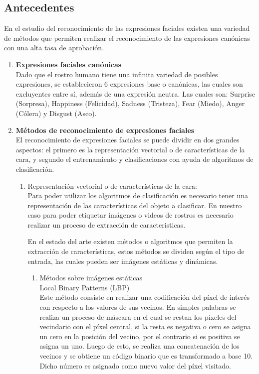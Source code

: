 \documentclass{article}
\begin{document}
    \subsection{Antecedentes}
En el estudio del reconocimiento de las expresiones faciales existen una variedad de métodos que permiten realizar el reconocimiento de las expresiones canónicas con una alta tasa de aprobación.
        \begin{enumerate}
        \item \textbf{Expresiones faciales canónicas}\\
                Dado que el rostro humano tiene una infinita variedad de posibles expresiones, se establecieron 6 expresiones base o canónicas, las cuales son excluyentes entre sí, además de una expresión neutra. Las cuales son:  Surprise (Sorpresa), Happiness (Felicidad), Sadness (Tristeza), Fear (Miedo), Anger (Cólera) y Disgust (Asco).
        \item \textbf{Métodos de reconocimiento de expresiones faciales} \\
        El reconocimiento de expresiones faciales se puede dividir en dos grandes aspectos: el primero es la representación vectorial o de características de la cara, y segundo el entrenamiento y clasificaciones con ayuda de algoritmos de clasificación.
        
        \begin{enumerate}
        \item Representación vectorial o de características de la cara:\\
        Para poder utilizar los algoritmos de clasificación es necesario tener una representación de las características del objeto a clasificar. En nuestro caso para poder etiquetar imágenes o videos de rostros es necesario realizar un proceso de extracción de caracteristicas. 

En el estado del arte existen métodos o algoritmos que permiten la extracción de características, estos métodos se dividen según el tipo de entrada, las cuales pueden ser imágenes estáticas y dinámicas.  
            \begin{enumerate}
                \item Métodos sobre imágenes estáticas\\
                     Local Binary Patterns (LBP)\\
                    Este método consiste en realizar una codificación del píxel de interés con respecto a los valores de sus vecinos. En simples palabras se realiza un proceso de máscara en el cual se restan los píxeles del vecindario con el píxel central, si la resta es negativa o cero se asigna un cero en la posición del vecino, por el contrario si es positiva se asigna un uno. Luego de esto, se realiza una concatenación de los vecinos y se obtiene un código binario que es transformado a base 10. Dicho número es asignado como nuevo valor del píxel visitado.


\end{enumerate}
\end{enumerate}
\end{enumerate}
\end{document}
